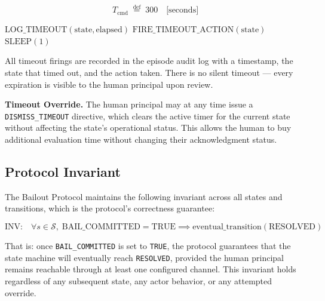 \[
T_{\text{cmd}} \; \overset{\text{def}}{=} \; 300 \quad \text{[seconds]}
\]

\bigskip

\begin{algorithm}
\caption{Timeout Monitor}
\label{alg:timeout}
\begin{algorithmic}[1]
\Statex {}
                \State $\text{LOG\_TIMEOUT}(\text{state}, \text{elapsed})$
                \State $\text{FIRE\_TIMEOUT\_ACTION}(\text{state})$
            \EndIf
        \EndFor
        \State $\text{SLEEP}(1)$
    \EndWhile
\EndFunction
\end{algorithmic}
\end{algorithm}

\bigskip

All timeout firings are recorded in the episode audit log with a timestamp, the state that timed out, and the action taken. There is no silent timeout — every expiration is visible to the human principal upon review.

\bigskip

\noindent\textbf{Timeout Override.} The human principal may at any time issue a \texttt{DISMISS\_TIMEOUT} directive, which clears the active timer for the current state without affecting the state's operational status. This allows the human to buy additional evaluation time without changing their acknowledgment status.

\bigskip

\subsection{Protocol Invariant}

The Bailout Protocol maintains the following invariant across all states and transitions, which is the protocol's correctness guarantee:

\[
\text{INV:} \quad \forall s \in \mathcal{S}, \; \text{BAIL\_COMMITTED} = \text{TRUE} \implies \text{eventual\_transition}(\text{RESOLVED})
\]

That is: once \texttt{BAIL\_COMMITTED} is set to \texttt{TRUE}, the protocol guarantees that the state machine will eventually reach \texttt{RESOLVED}, provided the human principal remains reachable through at least one configured channel. This invariant holds regardless of any subsequent state, any actor behavior, or any attempted override.

